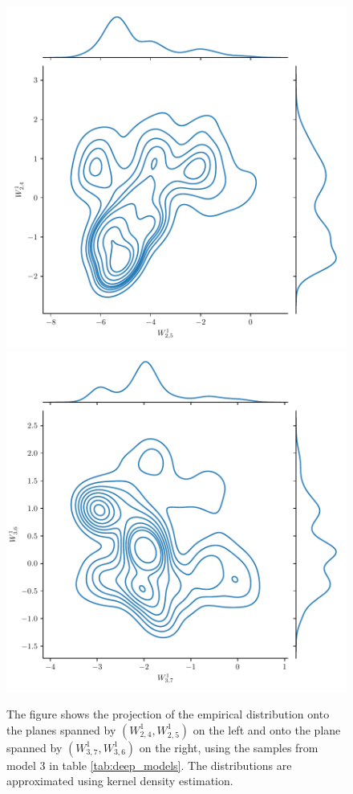 \begin{figure}[h!]
    \centering
    \includegraphics[scale=0.7]{figures/posterior_distribution/posterior_weights1.pdf}
    \includegraphics[scale=0.7]{figures/posterior_distribution/posterior_weights2.pdf}
    \caption{The figure shows the projection of the empirical distribution onto the planes spanned by $(W_{2,4}^1, W_{2,5}^1)$ on the left and onto the plane spanned by $(W_{3,7}^1, W_{3, 6}^1)$ on the right, using the samples from model 3 in table \ref{tab:deep_models}. The distributions are approximated using kernel density estimation. 
    }
    \label{fig:posterior_kernels}
\end{figure}


